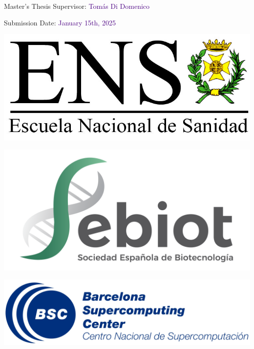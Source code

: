 \begin{titlepage}
\begin{flushleft}
        Master's Thesis Supervisor: \textcolor{indigo}{Tomás Di Domenico} 
        
        Submission Date: \textcolor{indigo}{January 15th, 2025}
    \end{flushleft}

    \vfill

    \begin{minipage}[t]{0.20\textwidth}
        \includegraphics[width=\textwidth]{img/logo-ENS.jpg}
    \end{minipage}
    \hfill
    \begin{minipage}[t]{0.20\textwidth}
        \includegraphics[width=\textwidth]{img/sebiot_logo.png}
    \end{minipage}
    \hfill
    \begin{minipage}[t]{0.35\textwidth}
        \includegraphics[width=\textwidth]{img/biysc_bsc_logo.png}
    \end{minipage}
    \hfill
    \begin{minipage}[t]{0.17\textwidth}

\end{minipage}
\end{titlepage}
